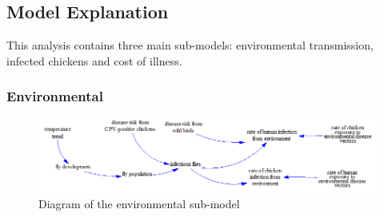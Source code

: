 \subsection{Model Explanation}
   
This analysis contains three main sub-models: environmental transmission, infected chickens and cost of illness. 

\subsubsection*{Environmental}

\begin{figure}[!ht]
	\centering
	\includegraphics[width=1\textwidth]{images/environmental_submodel2.png}
	\caption{Diagram of the environmental sub-model}
	\label{fig:environmental_submodel}
\end{figure}


